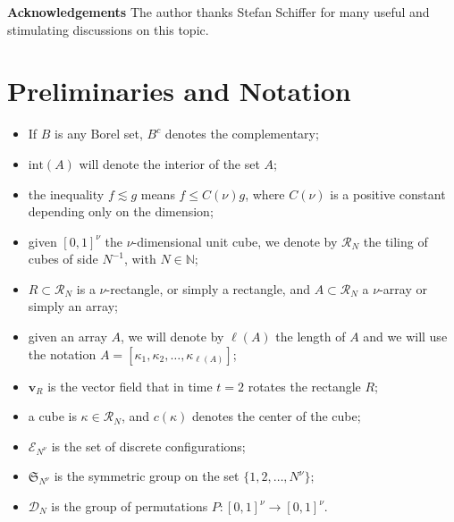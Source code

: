 \documentclass[12 pt]{article}
\theoremstyle{definition} \newtheorem{definition}{Definition}[section]
\theoremstyle{definition} \newtheorem{remark}[definition]{Remark}
\theoremstyle{plain} \newtheorem{lemma}[definition]{Lemma}
\theoremstyle{plain} \newtheorem{proposition}[definition]{Proposition}
\theoremstyle{plain} \newtheorem{theorem}[definition]{Theorem}
\theoremstyle{plain} \newtheorem{corollary}[definition]{Corollary}
\theoremstyle{definition} \newtheorem{example}[definition]{Example}
\theoremstyle{definition} \newtheorem{assumption}[definition]{Assumption}
\theoremstyle{definition} \newtheorem{conjecture}[definition]{Conjecture}
\newcommand{\1}{\mathbbm 1}
\numberwithin{equation}{section}
\begin{document}
\medskip
      
       \textbf{Acknowledgements} The author thanks Stefan Schiffer for many useful and stimulating discussions on this topic.
\section{Preliminaries and Notation}\label{S:preliminaries}
\begin{itemize}
 \item If $B$ is any Borel set, $B^c$ denotes the complementary;
 \item $\text{int}(A)$ will denote the interior of the set $A$;
 \item the inequality $f\lesssim g$ means $f\leq C(\nu)g$, where $C(\nu)$ is a positive constant depending only on the dimension;
\item given $[0,1]^\nu$ the $\nu$-dimensional unit cube, we denote by $\mathcal{R}_N$ the tiling of cubes of side $N^{-1}$, with $N\in\mathbb{N}$;
    \item $R\subset\mathcal{R}_N$ is a $\nu$-rectangle, or simply a rectangle, and $A\subset\mathcal{R}_N$ a $\nu$-array or simply an array;
    \item given an array $A$, we will denote by $\ell(A)$ the length of $A$ and we will use the notation $A=[\kappa_1,\kappa_2,\dots,\kappa_{\ell(A)}]$;
    \item $\mathbf v_R$ is the vector field that in time $t=2$ rotates the rectangle $R$;
   
    \item a cube is $\kappa\in\mathcal{R}_N$, and $c(\kappa)$ denotes the center of the cube;
    \item $\mathcal E_{N^\nu}$ is the set of discrete configurations;
    \item $\mathfrak S_{N^\nu}$ is the symmetric group on the set $\lbrace 1,2,\dots,N^\nu\rbrace$;
    \item $\mathcal{D}_{N}$ is the group of permutations $P:[0,1]^\nu\rightarrow [0,1]^\nu$.
    \end{itemize}
\end{document}
